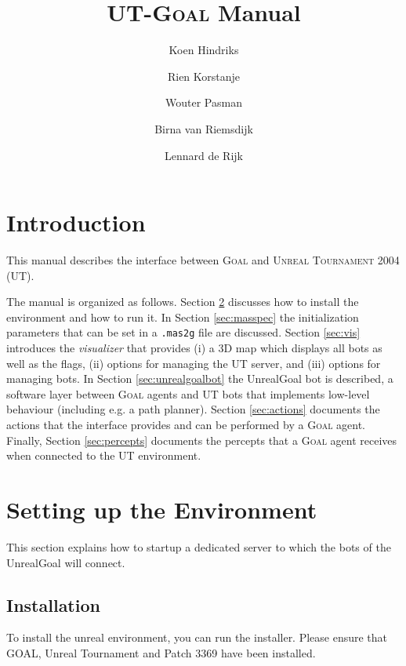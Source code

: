 \documentclass[11pt,a4paper]{article}
\newcommand{\Goal}{\textsc{Goal}}
\begin{document}
%
\title{UT-{\Goal} Manual}

%
\author{Koen Hindriks}
\author{Rien Korstanje}
\author{Wouter Pasman}
\author{Birna van Riemsdijk}
\author{Lennard de Rijk}

%
\maketitle

\newpage

%
%
%
\section{Introduction}
%

This manual describes the interface between {\Goal} and \textsc{Unreal Tournament 2004} (UT).

The manual is organized as follows. Section \ref{sec:setup} discusses how to install the environment and how to run it. In Section \ref{sec:masspec} the initialization parameters that can be set in a \texttt{.mas2g} file are discussed. Section \ref{sec:vis} introduces the \emph{visualizer} that provides (i) a 3D map which displays all bots as well as the flags, (ii) options for managing the UT server, and (iii) options for managing bots. In Section \ref{sec:unrealgoalbot} the UnrealGoal bot is described, a software layer between {\Goal} agents and UT bots that implements low-level behaviour (including e.g. a path planner). Section \ref{sec:actions} documents the actions that the interface provides and can be performed by a {\Goal} agent. Finally, Section \ref{sec:percepts} documents the percepts that a {\Goal} agent receives when connected to the UT environment.


%
%
%
\section{Setting up the Environment}\label{sec:setup}

This section explains how to startup a dedicated server to which the bots of the UnrealGoal  will connect. 

\subsection{Installation}

To install the unreal environment, you can run the installer.  Please ensure that GOAL, Unreal Tournament and Patch 3369 have been installed. 
\end{document}
